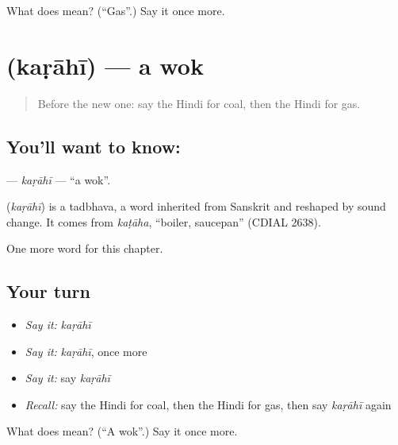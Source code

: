 \begin{tcolorbox}[breakable,colback=teal!4,colframe=teal!35!black,title={Before you move on}]
What does  mean? (\textquotedblleft{}Gas\textquotedblright{}.) Say it once more.
\end{tcolorbox}
\section[\texorpdfstring{\hi{कड़ाही} (kaṛāhī)}{कड़ाही (kaṛāhī)}]{ (kaṛāhī) — a wok}

\label{lesson:HI-C269-karahi}



\begin{quote}
Before the new one: say the Hindi for coal, then the Hindi for gas.
\end{quote}

\subsection*{You'll want to know: }
\textbf{} — \emph{kaṛāhī} — \textquotedblleft{}a wok\textquotedblright{}.

\begin{cousinweb}
\textbf{} (\emph{kaṛāhī}) is a tadbhava, a word inherited from Sanskrit and reshaped by sound change. It comes from \emph{kaṭāha}, \textquotedblleft{}boiler, saucepan\textquotedblright{} (CDIAL 2638).
\end{cousinweb}

\begin{grammarlens}[title={What you've built}]
One more word for this chapter.
\end{grammarlens}

\subsection*{Your turn}
\begin{itemize}
\raggedright
  \item \emph{Say it:} \emph{kaṛāhī}
  \item \emph{Say it:} \emph{kaṛāhī}, once more
  \item \emph{Say it:} say \emph{kaṛāhī}
  \item \emph{Recall:} say the Hindi for coal, then the Hindi for gas, then say \emph{kaṛāhī} again
\end{itemize}

\begin{tcolorbox}[breakable,colback=teal!4,colframe=teal!35!black,title={Before you move on}]
What does  mean? (\textquotedblleft{}A wok\textquotedblright{}.) Say it once more.
\end{tcolorbox}
